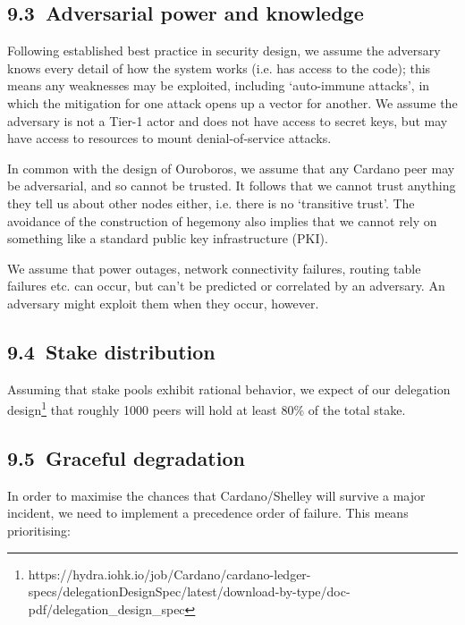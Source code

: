 \documentclass[]{article}
\begin{document}
\hypertarget{adversarial-power-and-knowledge}{%
\subsection{​9.3​~Adversarial power and
knowledge}\label{adversarial-power-and-knowledge}}

Following established best practice in security design, we assume the
adversary knows every detail of how the system works (i.e. has access to
the code); this means any weaknesses may be exploited, including
`auto-immune attacks', in which the mitigation for one attack opens up a
vector for another. We assume the adversary is not a Tier-1 actor and
does not have access to secret keys, but may have access to resources to
mount denial-of-service attacks.

In common with the design of Ouroboros, we assume that any Cardano peer
may be adversarial, and so cannot be trusted. It follows that we cannot
trust anything they tell us about other nodes either, i.e. there is no
`transitive trust'. The avoidance of the construction of hegemony also
implies that we cannot rely on something like a standard public key
infrastructure (PKI).

We assume that power outages, network connectivity failures, routing
table failures etc. can occur, but can't be predicted or correlated by
an adversary. An adversary might exploit them when they occur, however.

\hypertarget{stake-distribution}{%
\subsection{​9.4​~Stake distribution}\label{stake-distribution}}

Assuming that stake pools exhibit rational behavior, we expect of our
delegation design\footnote{https://hydra.iohk.io/job/Cardano/cardano-ledger-specs/delegationDesignSpec/latest/download-by-type/doc-pdf/delegation\_design\_spec}
that roughly 1000 peers will hold at least 80\% of the total stake.

\hypertarget{graceful-degradation}{%
\subsection{​9.5​~Graceful degradation}\label{graceful-degradation}}

In order to maximise the chances that Cardano/Shelley will survive a
major incident, we need to implement a precedence order of failure. This
means prioritising:
\end{document}
